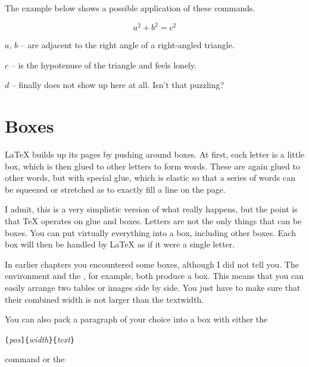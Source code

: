 \noindent The example below shows a possible application of these commands.

\begin{example}
\flushleft
\newenvironment{vardesc}[1]{%
  \settowidth{\parindent}{#1:\ }
  \makebox[0pt][r]{#1:\ }}{}

\begin{displaymath}
a^2+b^2=c^2
\end{displaymath}

\begin{vardesc}{Where}$a$,
$b$ -- are adjacent to the right
angle of a right-angled triangle.

$c$ -- is the hypotenuse of
the triangle and feels lonely.

$d$ -- finally does not show up
here at all. Isn't that puzzling?
\end{vardesc}
\end{example}

\section{Boxes}
\LaTeX{} builds up its pages by pushing around boxes. At first, each
letter is a little box, which is then glued to other letters to form
words. These are again glued to other words, but with special glue,
which is elastic so that a series of words can be squeezed or
stretched as to exactly fill a line on the page.

I admit, this is a very simplistic version of what really happens, but the
point is that \TeX{} operates on glue and boxes. Letters are not the only
things that can be boxes. You can put virtually everything into a box,
including other boxes. Each box will then be handled by \LaTeX{} as if it
were a single letter.

In earlier chapters you encountered some boxes, although I did
not tell you. The  environment and the , for
example, both produce a box. This means that you can easily arrange two
tables or images side by side. You just have to make sure that their
combined width is not larger than the textwidth.

You can also pack a paragraph of your choice into a box with either
the

\begin{lscommand}
\verb|[|\emph{pos}\verb|]{|\emph{width}\verb|}{|\emph{text}\verb|}|
\end{lscommand}

\noindent command or the


